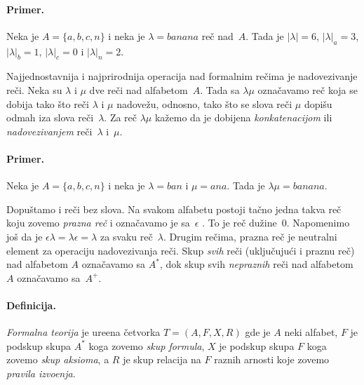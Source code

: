 \paragraph{Primer.}
  Neka je $A = \{a, b, c, n\}$ i neka je $\lambda = banana$ re\v c nad~$A$. Tada je $|\lambda| = 6$,
  $|\lambda|_a = 3$, $|\lambda|_b = 1$, $|\lambda|_c = 0$ i $|\lambda|_n = 2$.

\bigskip

Najjednostavnija i najprirodnija operacija nad formalnim re\v cima je nadovezivanje re\v ci.
Neka su $\lambda$ i $\mu$ dve re\v ci nad alfabetom~$A$. Tada sa $\lambda\mu$ ozna\v cavamo re\v c koja se dobija
tako \v sto re\v ci $\lambda$ i $\mu$ nadove\v zu, odnosno, tako \v sto se slova re\v ci $\mu$
dopi\v su odmah iza slova re\v ci~$\lambda$. Za re\v c $\lambda\mu$ ka\v zemo da je dobijena
\emph{konkatenacijom}%
ili \emph{nadovezivanjem}%
re\v ci~$\lambda$ i~$\mu$.

\paragraph{Primer.} Neka je $A = \{a, b, c, n\}$ i neka je $\lambda = ban$ i $\mu = ana$.
  Tada je $\lambda\mu = banana$.

\bigskip

Dopu\v stamo i re\v ci bez slova. Na svakom alfabetu postoji ta\v cno jedna takva re\v c
koju zovemo \emph{prazna re\v c}%
i ozna\v cavamo je sa~$\epsilon$%
    .
To je re\v c du\v zine~$0$.
Napomenimo jo\v s da je $\epsilon \lambda = \lambda \epsilon = \lambda$ za svaku re\v c~$\lambda$.
Drugim re\v cima, prazna re\v c je neutralni element za operaciju nadovezivanja re\v ci.
Skup \emph{svih} re\v ci (uklju\v cuju\'ci i praznu re\v c) nad alfabetom $A$ ozna\v cavamo sa $A^*$,%
dok skup svih \emph{nepraznih} re\v ci nad alfabetom $A$ ozna\v cavamo sa~$A^+$.%
    
\paragraph{Definicija.}
  \emph{Formalna teorija} je ure\dj ena \v cetvorka $T = (A, F, X, R)$ gde je $A$ neki alfabet, $F$ je podskup skupa
  $A^*$ koga zovemo \emph{skup formula}, $X$ je podskup skupa $F$ koga zovemo \emph{skup aksioma},
  a $R$ je skup relacija na $F$ raznih arnosti koje zovemo \emph{pravila izvo\dj enja}.

